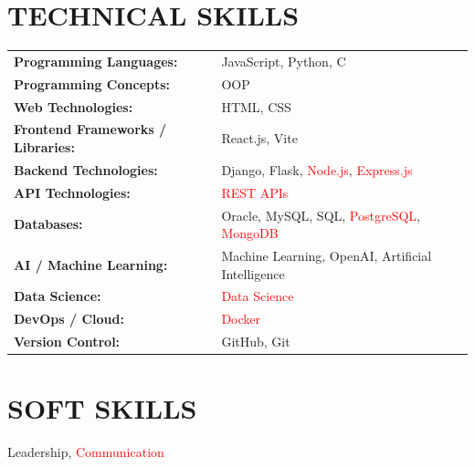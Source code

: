 \documentclass[8.5pt,a4paper]{extarticle}
\begin{document}
\section*{TECHNICAL SKILLS}
\small
\begin{tabular}{@{}p{2.2in}p{5.1in}@{}}
\textbf{Programming Languages:} & JavaScript, Python, C \\
\textbf{Programming Concepts:} & OOP \\
\textbf{Web Technologies:} & HTML, CSS \\
\textbf{Frontend Frameworks / Libraries:} & React.js, Vite \\
\textbf{Backend Technologies:} & Django, Flask, \textcolor{red}{Node.js}, \textcolor{red}{Express.js} \\
\textbf{API Technologies:} & \textcolor{red}{REST APIs} \\
\textbf{Databases:} & Oracle, MySQL, SQL, \textcolor{red}{PostgreSQL}, \textcolor{red}{MongoDB} \\
\textbf{AI / Machine Learning:} & Machine Learning, OpenAI, Artificial Intelligence \\
\textbf{Data Science:} & \textcolor{red}{Data Science} \\
\textbf{DevOps / Cloud:} & \textcolor{red}{Docker} \\
\textbf{Version Control:} & GitHub, Git \\
\end{tabular}

\section*{SOFT SKILLS}
\noindent Leadership, \textcolor{red}{Communication} \vspace{4pt}



\end{document}
